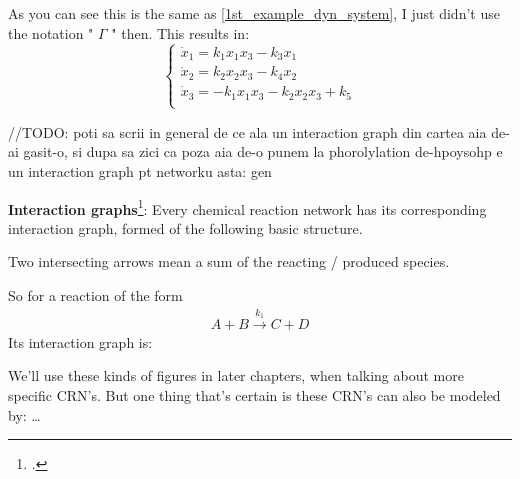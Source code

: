 As you can see this is the same as \ref{1st_example_dyn_system}, I just didn't use the notation " $\Gamma$ " then. This results in:
\[
	\begin{cases*}
		\dot{x}_1 = k_1 x_1 x_3 - k_3x_1  \\
		\dot{x}_2 = k_2 x_2 x_3 - k_4 x_2  \\
		\dot{x}_3 = -k_1 x_1 x_3 - k_2 x_2 x_3 + k_5 \\
	\end{cases*}
\]

\hfill\break
//TODO: poti sa scrii in general de ce ala un interaction graph din cartea aia de-ai gasit-o, si dupa sa zici ca poza aia de-o punem la phorolylation de-hpoysohp e un interaction graph pt networku asta: gen
\hfill\break

\textbf{Interaction graphs}\footcite{Derbez2015}: Every chemical reaction network has its corresponding interaction graph, formed of the following basic structure.

Two intersecting arrows mean a sum of the reacting / produced species.

So for a reaction of the form
\begin{align*}
	A + B \xrightarrow{k_{1}} C + D
\end{align*}
Its interaction graph is:

We'll use these kinds of figures in later chapters, when talking about more specific CRN's.
But one thing that's certain is these CRN's can also be modeled by: \ldots